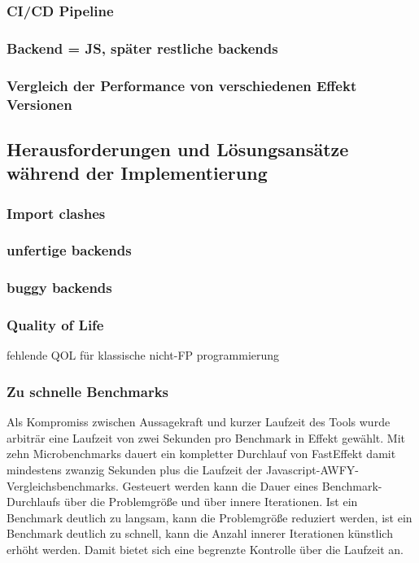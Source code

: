 \subsubsection{CI/CD Pipeline }
\subsubsection{ Backend = JS, später restliche backends }
\subsubsection{ Vergleich der Performance von verschiedenen Effekt Versionen }
 

\subsection{Herausforderungen und Lösungsansätze während der Implementierung}

\subsubsection{Import clashes}

\subsubsection{unfertige backends}

\subsubsection{buggy backends}

\subsubsection{ Quality of Life }
fehlende QOL für klassische nicht-FP programmierung

\subsubsection{ Zu schnelle Benchmarks }
Als Kompromiss zwischen Aussagekraft und kurzer Laufzeit des Tools wurde arbiträr eine Laufzeit von zwei Sekunden pro Benchmark in Effekt gewählt.
Mit zehn Microbenchmarks dauert ein kompletter Durchlauf von FastEffekt damit mindestens zwanzig Sekunden plus die Laufzeit der Javascript-AWFY-Vergleichsbenchmarks.
Gesteuert werden kann die Dauer eines Benchmark-Durchlaufs über die Problemgröße und über innere Iterationen. Ist ein Benchmark deutlich zu langsam, kann die Problemgröße reduziert werden, ist ein Benchmark deutlich zu schnell, kann die Anzahl innerer Iterationen künstlich erhöht werden. Damit bietet sich eine begrenzte Kontrolle über die Laufzeit an.


